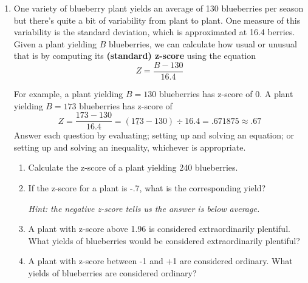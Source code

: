 \begin{enumerate}
\newpage %

\item One variety of blueberry plant yields an average of 130 blueberries per season but there's quite a bit of variability from plant to plant.  One measure of this variability is the standard deviation, which is approximated at 16.4 berries.  Given a plant yielding $B$ blueberries, we can calculate how usual or unusual that is by computing its \textbf{(standard) z-score} using the equation $$Z = \frac{B-130}{16.4}$$  

For example, a plant yielding $B=130$ blueberries has z-score of 0.  A plant yielding $B = 173$ blueberries has z-score of $$Z=\frac{173-130}{16.4} = (\underline{173}-130)\div 16.4 = .671875 \approx .67$$ 
Answer each question by evaluating; setting up and solving an equation; or setting up and solving an inequality, whichever is appropriate.
\begin{enumerate}
\item Calculate the z-score of a plant yielding 240 blueberries.   \vfill
\item If the z-score for a plant is -.7, what is the corresponding yield?  

\emph{Hint:  the negative z-score tells us the answer is below average.}   \vfill
\item A plant with z-score above 1.96 is considered extraordinarily plentiful.  What yields of blueberries would be considered extraordinarily plentiful?   \vfill
\item A plant with  z-score between -1 and +1 are considered ordinary.  What yields of blueberries are considered ordinary?   \vfill
\end{enumerate}

\end{enumerate}

